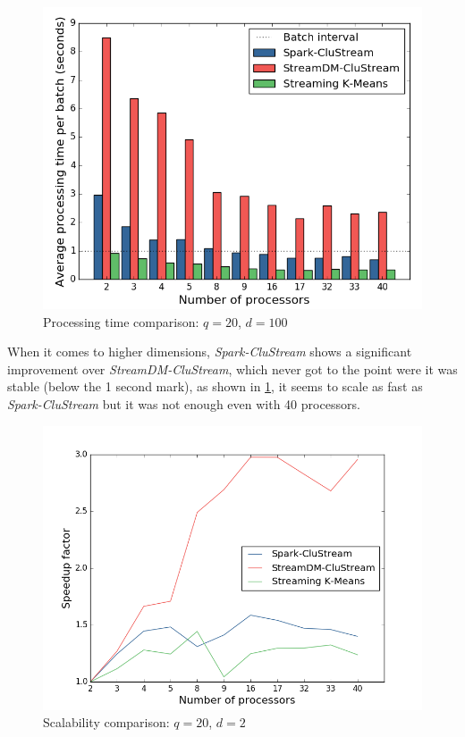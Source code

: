 \begin{figure}[h!]
 \centering
 \includegraphics[scale=0.47]{./styles/perfComp100.png}
 \caption{Processing time comparison: $q=20$, $d=100$}
 \label{fig:perfComp100}
\end{figure}

When it comes to higher dimensions, \textit{Spark-CluStream} shows a significant improvement over \textit{StreamDM-CluStream}, which never got to the point were it was stable (below the 1 second mark), as shown in \ref{fig:perfComp100}, it seems to scale as fast as \textit{Spark-CluStream} but it was not enough even with 40 processors. 


\begin{figure}[h!]
 \centering
 \includegraphics[scale=0.47]{./styles/scalComp2.png}
 \caption{Scalability comparison: $q=20$, $d=2$}
 \label{fig:scalComp2}
\end{figure}

